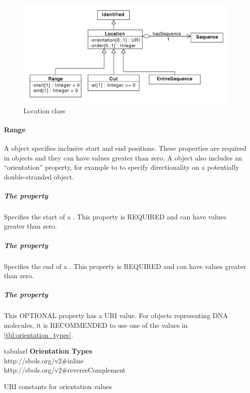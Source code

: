 \begin{figure}[ht]
\begin{center}
\includegraphics[scale=0.6]{uml/location}
\caption[]{Location class}
\label{uml:location}
\end{center}
\end{figure}




\paragraph{Range}
\label{sec:Range}
A  object specifies inclusive start and end positions. These properties are required in  objects and they can have  values greater than zero. A  object also includes an  ``orientation'' property, for example to to specify directionality on a potentially double-stranded  object.

\subparagraph{The  property}
Specifies the start of a . This property is REQUIRED and can have  values greater than zero.

\subparagraph{The  property}
Specifies the end of a . This property is REQUIRED and can have  values greater than zero.

\subparagraph{The  property}
This OPTIONAL property has a URI value. For  objects representing DNA molecules, it is RECOMMENDED to use one of the values in \ref{tbl:orientation_types}. 

\begin{table}[ht]
  \begin{edtable}{tabular}{l}
    \toprule
    \textbf{Orientation Types}  \\
    \midrule
    http://sbols.org/v2\#inline\\
    http://sbols.org/v2\#reverseComplement\\
    \bottomrule
  \end{edtable}
  \caption{URI constants for orientation values}
  \label{tbl:orientation_types}
\end{table}

